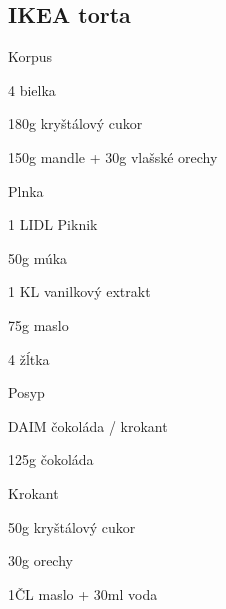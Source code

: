 \setcounter{step}{0}
\subsection{IKEA torta}

\begin{ingredient}
\begin{main}
\item
\end{main}
\begin{subingredient}{Korpus}
	\item 4 bielka
	\item 180g kryštálový cukor
	\item 150g mandle + 30g vlašské orechy
\end{subingredient}
\begin{subingredient}{Plnka}
	\item 1 LIDL Piknik
	\item 50g múka
	\item 1 KL vanilkový extrakt
	\item 75g maslo
	\item 4 žĺtka
\end{subingredient}
\begin{subingredient}{Posyp}
	\item DAIM čokoláda / krokant
	\item 125g čokoláda
\end{subingredient}
\begin{subingredient}{Krokant}
	\item 50g kryštálový cukor
	\item 30g orechy
	\item 1ČL maslo + 30ml voda
\end{subingredient}
\end{ingredient}%
\begin{recipe}








\end{recipe}


